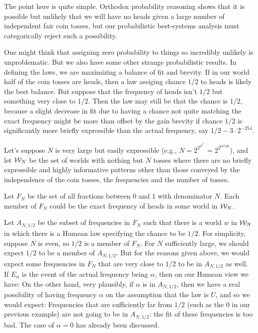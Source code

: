 The point here is quite simple. Orthodox probability reasoning shows that it is possible but unlikely that we will have no heads given
a large number of independent fair coin tosses, but our probabilistic best-systems analysis must categorically reject such a possibility.

One might think that assigning zero probability to things so incredibly unlikely is unproblematic. But we also have some other strange
probabilistic results. In defining the laws, we are maximizing a balance of fit and brevity. If in our world half of the coin tosses 
are heads, then a law assiging chance $1/2$ to heads is likely the best balance. But suppose that the frequency of heads isn't $1/2$
but something very close to $1/2$. Then the law may still be that the chance is $1/2$, because a slight decrease in fit due to having
a chance not quite matching the exact frequency might be more than offset by the gain brevity if chance $1/2$ is significantly more
briefly expressible than the actual frequency, say $1/2-3\cdot 2^{-254}$.

Let's suppose $N$ is very large but easily expressible (e.g., $N=2^{2^{2^{2^{2^2}}}}=2^{2^{65536}}$), and let $\mathcal W_N$ be 
the set of worlds with nothing but $N$ tosses where there are no briefly expressible and highly informative patterns other than 
those conveyed by the independence of the coin tosses, the frequencies and the number of tosses.

Let $F_N$ be the set of all fractions between $0$ and $1$ with denominator $N$. Each member of $F_N$ could be the exact frequency
of heads in some world in $\mathcal W_N$.

Let $A_{N,1/2}$ be the subset of frequencies in $F_N$ such that there is a world $w$ in $\mathcal W_N$ in which there is a Humean
law specifying the chance to be $1/2$. For simplicity, suppose $N$ is even, so $1/2$ is a member of $F_N$. For $N$ sufficiently large, we 
should expect $1/2$ to be a member of $A_{N,1/2}$. But for the reasons given above, we would expect some frequencies in $F_N$ that are very
close to $1/2$ to be in $A_{N,1/2}$ as well. If $E_\alpha$ is the event of the actual frequency being $\alpha$, then on our Humean
view we have:
On the other hand, very plausibly, if $\alpha$ is in $A_{N,1/2}$, then we have a real possibility of having frequency $\alpha$
on the assumption that the law is $U$, and so we would expect:
Frequencies that are sufficiently far from $1/2$ (such as the $0$ in our previous example) are not going to be in $A_{N,1/2}$: the fit 
of these frequencies is too bad. The case of $\alpha=0$ has already been discussed.

